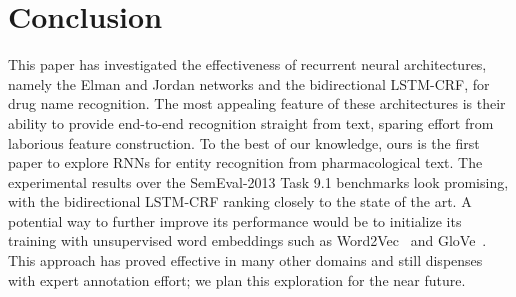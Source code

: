 \documentclass[11pt,letterpaper]{article}
\begin{document}
\section{Conclusion}
\label{sec:blind}
This paper has investigated the effectiveness of recurrent neural architectures, namely the Elman and Jordan networks and the bidirectional LSTM-CRF, for drug name recognition. The most appealing feature of these architectures is their ability to provide end-to-end recognition straight from text, sparing effort from laborious feature construction. To the best of our knowledge, ours is the first paper to explore RNNs for entity recognition from pharmacological text. The experimental results over the SemEval-2013 Task 9.1 benchmarks look promising, with the bidirectional LSTM-CRF ranking closely to the state of the art. A potential way to  further improve its performance would be to initialize its training with unsupervised word embeddings such as Word2Vec~\cite{Mikolov:13} and GloVe~\cite{Pennington:14}. This approach has proved effective in many other domains and still dispenses with expert annotation effort; we plan this exploration for the near future. 

\newpage 

\end{document}
